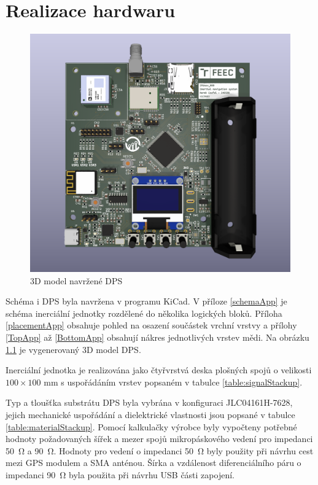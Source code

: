 \chapter{Realizace hardwaru} \label{hardware}
\begin{figure}[h]
    \centering
    \includegraphics[width=\textwidth]{KiCad/3Dboard}
    \caption{3D model navržené DPS}
    \label{fig:3Dboard}
\end{figure}

Schéma i \ac{DPS} byla navržena v programu KiCad. V příloze \ref{schemaApp} je schéma inerciální jednotky rozdělené do několika logických bloků. Příloha \ref{placementApp} obsahuje pohled na osazení součástek vrchní vrstvy a přílohy \ref{TopApp} až \ref{BottomApp} obsahují nákres jednotlivých vrstev mědi. Na obrázku \ref{fig:3Dboard} je vygenerovaný 3D model \ac{DPS}.

Inerciální jednotka je realizována jako čtyřvrstvá deska plošných spojů o velikosti $ 100 \times 100 $ mm s uspořádáním vrstev popsaném v tabulce \ref{table:signalStackup}.


Typ a tloušťka substrátu \ac{DPS} byla vybrána v konfiguraci JLC04161H-7628, jejich mechanické uspořádání a dielektrické vlastnosti jsou popsané v tabulce \ref{table:materialStackup}. Pomocí kalkulačky výrobce byly vypočteny potřebné hodnoty požadovaných šířek a mezer spojů mikropáskového vedení pro impedanci \SI{50}{\ohm} a \SI{90}{\ohm}. Hodnoty pro vedení o impedanci \SI{50}{\ohm} byly použity při návrhu cest mezi \ac{GPS} modulem a \ac{SMA} anténou. Šírka a vzdálenost diferenciálního páru o impedanci \SI{90}{\ohm} byla použita při návrhu \ac{USB} části zapojení.


